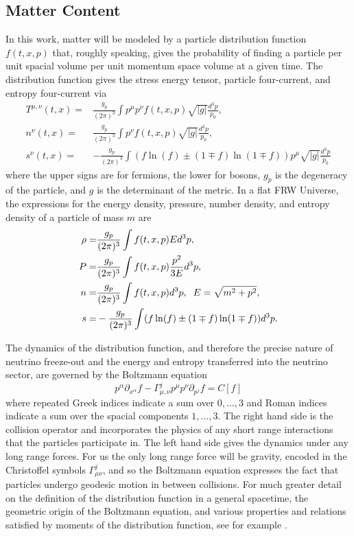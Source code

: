\subsection{Matter Content}
In this work, matter will be modeled by a particle distribution function $f(t,x,p)$ that, roughly speaking, gives the probability of finding a particle per unit spacial volume per unit momentum space volume at a given time.  The distribution function gives the stress energy tensor, particle four-current, and entropy four-current via 
\begin{align}
T^{\mu,\nu}(t,x)=&\frac{g_p}{(2\pi)^3}\int p^\mu p^\nu f(t,x,p) \sqrt{|g|}\frac{d^3p}{p_0},\\
n^\nu(t,x)=&\frac{g_p}{(2\pi)^3}\int p^\nu f(t,x,p) \sqrt{|g|}\frac{d^3p}{p_0},\\
s^\nu(t,x)=&-\frac{g_p}{(2\pi)^3}\int(f\ln(f)\pm(1\mp f)\ln(1\mp f))p^\mu\sqrt{|g|}\frac{d^3p}{p_0}
\end{align}
where the upper signs are for fermions, the lower for bosons, $g_p$ is the degeneracy of the particle, and $g$ is the determinant of the metric.  In a flat FRW Universe, the expressions for the  energy density, pressure, number density, and entropy density of a particle of mass $m$ are
\begin{align}\label{moments}
\rho=&\frac{g_p}{(2\pi)^3}\int f(t,x,p)Ed^3p,\\
P=&\frac{g_p}{(2\pi)^3}\int f(t,x,p)\frac{p^2}{3E}d^3p,\\
n=&\frac{g_p}{(2\pi)^3}\int f(t,x,p) d^3p, \hspace{2mm} E=\sqrt{m^2+p^2},\\
s=&-\frac{g_p}{(2\pi)^3}\int (f\ln(f)\pm(1\mp f)\ln(1\mp f)) d^3p.
\end{align}

The dynamics of the distribution function,  and therefore the precise nature of neutrino freeze-out and the energy and entropy transferred into the neutrino sector, are governed by the Boltzmann equation
\begin{equation}
p^\alpha\partial_{x^\alpha} f-\Gamma^{j}_{\mu,\nu}p^\mu p^\nu\partial_{p^j}f=C[f]
\end{equation}
where repeated Greek indices indicate a sum over $0,...,3$ and Roman indices indicate a sum over the spacial components $1,...,3$.  The right hand side is the collision operator and incorporates the physics of any short range interactions that the particles participate in. The left hand side gives the dynamics under any long range forces. For us the only long range force will be gravity, encoded in the Christoffel symbols $\Gamma^j_{\mu\nu}$, and so the Boltzmann equation expresses the fact that particles undergo geodesic motion in between collisions. For much greater detail on the definition of the distribution function in a general spacetime, the geometric origin of the Boltzmann equation, and various properties and relations satisfied by moments of the distribution function, see for example \cite{andre,cercignani,bruhat,ehlers,kolb,bernstein2004kinetic}.

